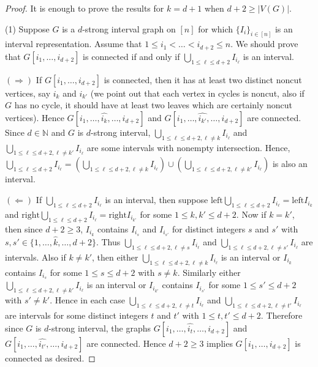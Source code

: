 \documentclass[12pt,reqno]{amsart}
\theoremstyle{plain}
\theoremstyle{definition}
\numberwithin{equation}{section}
\begin{document}
\begin{proof}
It is enough to prove the results for $k=d+1$ when $d+2\geq |V(G)|$.

(1) Suppose $G$ is a $d$-strong interval graph on $[n]$ for which $\{I_i\}_{i\in [n]}$ is an interval representation. Assume that $1\leq i_1< \dots < i_{d+2}\leq n$. We should prove that $G[i_1, \dots , i_{d+2}]$ is connected if and only if $\bigcup_{1\leq \ell \leq d+2}I_{i_\ell}$ is an interval.

$(\Longrightarrow )$ If $G[i_1, \dots , i_{d+2}]$ is connected, then it has at least two distinct noncut vertices, say $i_k$ and $i_{k'}$  (we point out that each vertex in cycles is noncut, also if $G$ has no cycle, it should have at least two leaves which are certainly noncut vertices). Hence $G[i_1, \dots ,\widehat{i_k}, \dots, i_{d+2}]$ and $G[i_1, \dots ,\widehat{i_{k'}}, \dots, i_{d+2}]$ are connected. Since $d\in \mathbb{N}$ and $G$ is $d$-strong interval,  $\bigcup_{1\leq \ell \leq d+2, \ell\neq k}I_{i_\ell}$ and $\bigcup_{1\leq \ell \leq d+2, \ell\neq k'}I_{i_\ell}$ are some intervals with nonempty intersection. Hence, $\bigcup_{1\leq \ell \leq d+2}I_{i_\ell}=(\bigcup_{1\leq \ell \leq d+2, \ell\neq k}I_{i_\ell}) \cup (\bigcup_{1\leq \ell \leq d+2, \ell\neq k'}I_{i_\ell})$ is also an interval.

$(\Longleftarrow )$ If $\bigcup_{1\leq \ell \leq d+2}I_{i_\ell}$ is an interval, then suppose $\mathrm{left} \bigcup_{1\leq \ell \leq d+2}I_{i_\ell}=\mathrm{left}I_{i_k}$ and  $\mathrm{right} \bigcup_{1\leq \ell \leq d+2}I_{i_\ell}=\mathrm{right}I_{i_{k'}}$ for some $1\leq k,k'\leq d+2$. Now if $k=k'$, then since $d+2\geq 3$, $I_{i_k}$ contains $I_{i_s}$ and $I_{i_{s'}}$ for distinct integers $s$ and $s'$ with $s,s'\in \{1, \dots, \widehat{k}, \dots , d+2\}$. Thus $\bigcup_{1\leq \ell \leq d+2, \ell\neq s}I_{i_\ell}$ and $\bigcup_{1\leq \ell \leq d+2, \ell\neq s'}I_{i_\ell}$ are intervals. Also if $k\neq k'$, then either $\bigcup_{1\leq \ell \leq d+2, \ell\neq k}I_{i_\ell}$ is an interval or $I_{i_k}$ contains $I_{i_s}$ for some $1\leq s \leq d+2$ with $s\neq k$. Similarly either $\bigcup_{1\leq \ell \leq d+2, \ell\neq k'}I_{i_\ell}$ is an interval or $I_{i_{k'}}$ contains $I_{i_{s'}}$ for some $1\leq s' \leq d+2$ with $s'\neq k'$. Hence in each case $\bigcup_{1\leq \ell \leq d+2, \ell\neq t}I_{i_\ell}$ and $\bigcup_{1\leq \ell \leq d+2, \ell\neq t'}I_{i_\ell}$ are intervals for some distinct integers $t$ and $t'$ with $1\leq t,t'\leq d+2$. Therefore since  $G$ is $d$-strong interval, the graphs $G[i_1, \dots , \widehat{i_t}, \dots , i_{d+2}]$ and $G[i_1, \dots , \widehat{i_{t'}}, \dots , i_{d+2}]$ are connected. Hence $d+2\geq 3$ implies $G[i_1, \dots, i_{d+2}]$  is connected as desired.


\end{proof}
\end{document}
